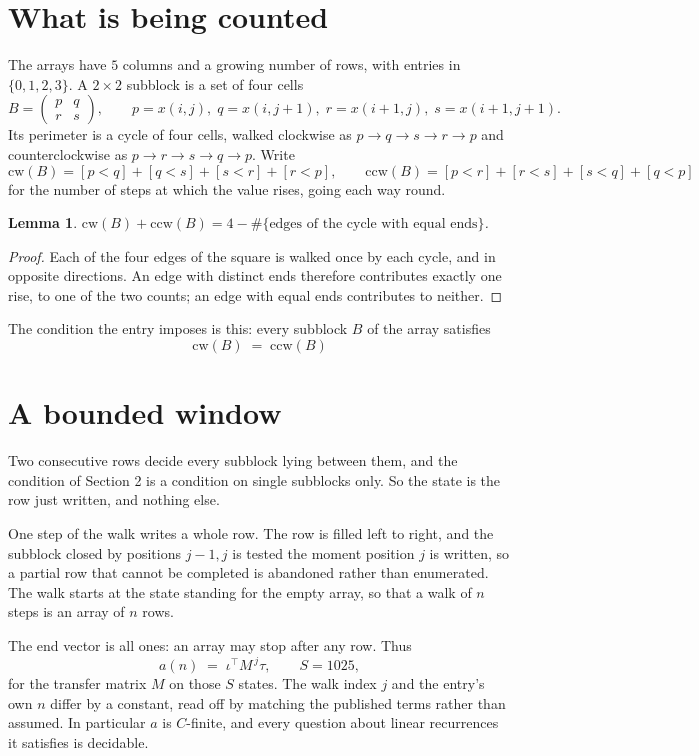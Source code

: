 \documentclass[11pt,a4paper]{article}
\theoremstyle{plain}
\newtheorem{lemma}[theorem]{Lemma}
\theoremstyle{definition}
\begin{document}
\section{What is being counted}

The arrays have $5$ columns and a growing number of rows, with entries in $\{0,1,2,3\}$. A
$2\times2$ subblock is a set of four cells
\[
B=\begin{pmatrix} p & q \\ r & s \end{pmatrix},
\qquad p=x(i,j),\; q=x(i,j+1),\; r=x(i+1,j),\; s=x(i+1,j+1).
\]
Its perimeter is a cycle of four cells, walked clockwise as $p\to q\to s\to r\to p$ and
counterclockwise as $p\to r\to s\to q\to p$. Write
\[
\mathrm{cw}(B)=[p<q]+[q<s]+[s<r]+[r<p],\qquad
\mathrm{ccw}(B)=[p<r]+[r<s]+[s<q]+[q<p]
\]
for the number of steps at which the value rises, going each way round.

\begin{lemma}\label{lem:sum}
$\mathrm{cw}(B)+\mathrm{ccw}(B)=4-\#\{\text{edges of the cycle with equal ends}\}$.
\end{lemma}

\begin{proof}
Each of the four edges of the square is walked once by each cycle, and in opposite directions.
An edge with distinct ends therefore contributes exactly one rise, to one of the two counts;
an edge with equal ends contributes to neither.
\end{proof}

The condition the entry imposes is this: every subblock $B$ of the array satisfies
\[
\mathrm{cw}(B)\;=\;\mathrm{ccw}(B)
\]


\section{A bounded window}

Two consecutive rows decide every subblock lying between them, and the condition of Section 2 is a condition on single subblocks only. So the state is the row just written, and nothing else.

One step of the walk writes a whole row. The row is filled left to right, and the subblock
closed by positions $j-1,j$ is tested the moment position $j$ is written, so a partial row that
cannot be completed is abandoned rather than enumerated. The walk starts at the state standing
for the empty array, so that a walk of $n$ steps is an array of $n$ rows.

The end vector is all ones: an array may stop after any row. Thus
\[
a(n)\;=\;\iota^{\!\top}M^{\,j}\tau ,\qquad S=1025,
\]
for the transfer matrix $M$ on those $S$ states. The walk index $j$ and the entry's own $n$
differ by a constant, read off by matching the published terms rather than assumed. In
particular $a$ is $C$-finite, and every question about linear recurrences it satisfies is
decidable.
\end{document}
